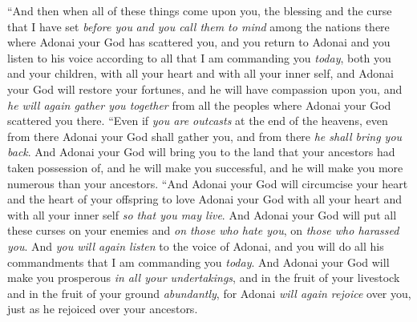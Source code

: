 \begin{biblechapter} %
\verse “And then when all of these things come upon you, the blessing and the curse that I have set \textit{before you} \textit{and you call them to mind} among the nations there where Adonai your God has scattered you,
\verse and you return to Adonai and you listen to his voice according to all that I am commanding you \textit{today}, both you and your children, with all your heart and with all your inner self,
\verse and Adonai your God will restore your fortunes, and he will have compassion upon you, and \textit{he will again gather you together} from all the peoples where Adonai your God scattered you there.
\verse “Even if \textit{you are outcasts} at the end of the heavens, even from there Adonai your God shall gather you, and from there \textit{he shall bring you back}.
\verse And Adonai your God will bring you to the land that your ancestors had taken possession of, and he will make you successful, and he will make you more numerous than your ancestors.
\verse “And Adonai your God will circumcise your heart and the heart of your offspring to love Adonai your God with all your heart and with all your inner self \textit{so that you may live}.
\verse And Adonai your God will put all these curses on your enemies and \textit{on those who hate you}, on \textit{those who harassed you}.
\verse And \textit{you will again listen} to the voice of Adonai, and you will do all his commandments that I am commanding you \textit{today}.
\verse And Adonai your God will make you prosperous \textit{in all your undertakings}, and in the fruit of your livestock and in the fruit of your ground \textit{abundantly}, for Adonai \textit{will again rejoice} over you, just as he rejoiced over your ancestors.

\end{biblechapter}
